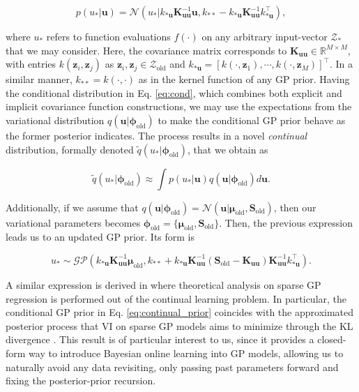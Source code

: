 \documentclass[]{article}
\def\K{{\mathbf K}}
\def\S{{\mathbf S}}
\def\u{{\mathbf u}}
\newcommand{\Zcal}{\mathcal{Z}}
\newcommand{\Ncal}{\mathcal{N}}
\newcommand{\zc}{\bm{z}}
\newcommand{\phiold}{{\bm{\phi}_{\text{old}}}}
\begin{document}
\begin{equation}
\label{eq:cond}
	p(u_*|\u) = \mathcal{N}(u_*|k_{*\u}\K^{-1}_{\u\u}\u, k_{**} - k_{*\u}\K^{-1}_{\u\u}k_{*\u}^\top),
\end{equation}

where  $u_*$ refers to function evaluations $f(\cdot)$ on any arbitrary input-vector $\Zcal_{*}$ that we may consider. Here, the covariance matrix corresponds to $\K_{\u\u} \in \mathbb{R}^{M\times M}$, with entries $k(\zc_i, \zc_j)$ as $\zc_i, \zc_j \in \Zcal_{\text{old}}$ and $k_{*\u} = [k(\cdot, \zc_1), \cdots, k(\cdot, \zc_M)]^\top$. In a similar manner, $k_{**} = k(\cdot, \cdot)$ as in the kernel function of any GP prior. Having the conditional distribution in Eq. \eqref{eq:cond}, which combines both explicit and implicit covariance function constructions, we may use the expectations from the variational distribution $q(\u|\phiold)$ to make the conditional GP prior behave as the former posterior indicates. The process results in a novel \textit{continual} distribution, formally denoted $\widetilde{q}(u_*|\phiold)$, that we obtain as

\begin{equation}
\widetilde{q}(u_*|\phiold) \approx \int p(u_*|\u) q(\u|\phiold)d\u.
\end{equation}

Additionally, if we assume that $q(\u|\phiold) = \Ncal(\u|\bm{\mu}_\text{old}, \S_\text{old})$, then our variational parameters becomes $\phiold = \{\bm{\mu}_\text{old}, \S_\text{old}\}$. Then, the previous expression leads us to an updated GP prior. Its form is

\begin{equation}
\label{eq:continual_prior}
	u_* \sim \mathcal{GP}(k_{*\u}\K^{-1}_{\u\u}\bm{\mu}_\text{old}, k_{**} + k_{*\u}\K^{-1}_{\u\u}(\S_\text{old} - \K_{\u\u})\K^{-1}_{\u\u}k^\top_{*\u}).
\end{equation}

A similar expression is derived in \citet{burt2019rates} where theoretical analysis on sparse GP regression is performed out of the continual learning problem. In particular, the conditional GP prior in Eq.  \eqref{eq:continual_prior} coincides with the approximated posterior process that VI on sparse GP models aims to minimize through the KL divergence \citep{matthews2016sparse}. This result is of particular interest to us, since it provides a closed-form way to introduce Bayesian online learning into GP models, allowing us to naturally avoid any data revisiting, only passing past parameters forward and fixing the posterior-prior recursion.
\end{document}
